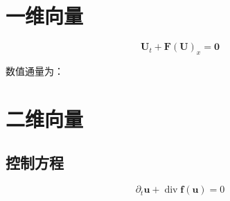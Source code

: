 \documentclass{article}
\numberwithin{equation}{subsection}    %
\begin{document}
\section{一维向量}

\begin{equation}
    \mathbf{U}_{t}+\mathbf{F}(\mathbf{U})_{x}=\mathbf{0}
\end{equation}

数值通量为：

\section{二维向量}
\subsection{控制方程}
\begin{equation}
    \partial_{t} \boldsymbol{u}+\operatorname{div} \boldsymbol{f} (\boldsymbol{u})=0
\end{equation}
\end{document}
